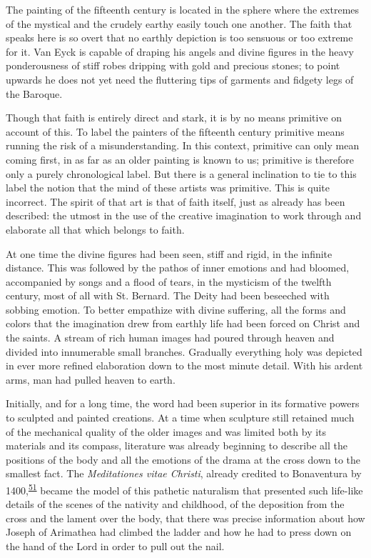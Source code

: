 The painting of the fifteenth century is located in the sphere where the
extremes of the mystical and the crudely earthy easily touch one
another. The faith that speaks here is so overt that no earthly
depiction is too sensuous or too extreme for it. Van Eyck
\protect\hypertarget{20_ILLUSTRATIONS_FOLLOW_PAGE.xhtmlux5cux23page_318}{}{}is
capable of draping his angels and divine figures in the heavy
ponderousness of stiff robes dripping with gold and precious stones; to
point upwards he does not yet need the fluttering tips of garments and
fidgety legs of the Baroque.

Though that faith is entirely direct and stark, it is by no means
primitive on account of this. To label the painters of the fifteenth
century primitive means running the risk of a misunderstanding. In this
context, primitive can only mean coming first, in as far as an older
painting is known to us; primitive is therefore only a purely
chronological label. But there is a general inclination to tie to this
label the notion that the mind of these artists was primitive. This is
quite incorrect. The spirit of that art is that of faith itself, just as
already has been described: the utmost in the use of the creative
imagination to work through and elaborate all that which belongs to
faith.

At one time the divine figures had been seen, stiff and rigid, in the
infinite distance. This was followed by the pathos of inner emotions and
had bloomed, accompanied by songs and a flood of tears, in the mysticism
of the twelfth century, most of all with St. Bernard. The Deity had been
beseeched with sobbing emotion. To better empathize with divine
suffering, all the forms and colors that the imagination drew from
earthly life had been forced on Christ and the saints. A stream of rich
human images had poured through heaven and divided into innumerable
small branches. Gradually everything holy was depicted in ever more
refined elaboration down to the most minute detail. With his ardent
arms, man had pulled heaven to earth.

Initially, and for a long time, the word had been superior in its
formative powers to sculpted and painted creations. At a time when
sculpture still retained much of the mechanical quality of the older
images and was limited both by its materials and its compass, literature
was already beginning to describe all the positions of the body and all
the emotions of the drama at the cross down to the smallest fact. The
\emph{Meditationes vitae Christi}, already credited to Bonaventura by
1400,\textsuperscript{\protect\hypertarget{20_ILLUSTRATIONS_FOLLOW_PAGE.xhtmlux5cux23id_371}{\protect\hyperlink{23_NOTES.xhtmlux5cux23id_372}{51}}}
became the model of this pathetic naturalism that presented such
life-like details of the scenes of the nativity and childhood, of the
deposition from the cross and the lament over the body, that there was
precise information about how Joseph of Arimathea had climbed the ladder
and how he had to press down on the hand of the Lord in order to pull
out the nail.

